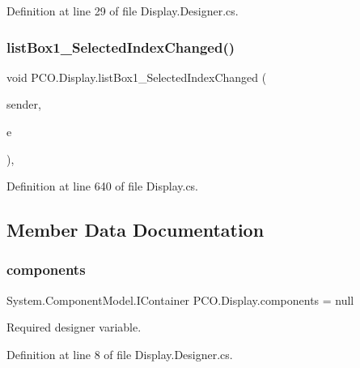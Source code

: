 Definition at line 29 of file Display.\+Designer.\+cs.

\mbox{\label{classPCO_1_1Display_a6786ad6a582e4a7c95f1d9ecb1b73bea}} 
\subsubsection{\texorpdfstring{list\+Box1\+\_\+\+Selected\+Index\+Changed()}{listBox1\_SelectedIndexChanged()}}
{\footnotesize\ttfamily void P\+C\+O.\+Display.\+list\+Box1\+\_\+\+Selected\+Index\+Changed (\begin{DoxyParamCaption}\item[{object}]{sender,  }\item[{Event\+Args}]{e }\end{DoxyParamCaption})\hspace{0.3cm}{\ttfamily [inline]}, {\ttfamily [private]}}



Definition at line 640 of file Display.\+cs.



\subsection{Member Data Documentation}
\mbox{\label{classPCO_1_1Display_a2ee7569345957e7ef1a938c63573dec4}} 
\subsubsection{\texorpdfstring{components}{components}}
{\footnotesize\ttfamily System.\+Component\+Model.\+I\+Container P\+C\+O.\+Display.\+components = null\hspace{0.3cm}{\ttfamily [private]}}



Required designer variable. 



Definition at line 8 of file Display.\+Designer.\+cs.

